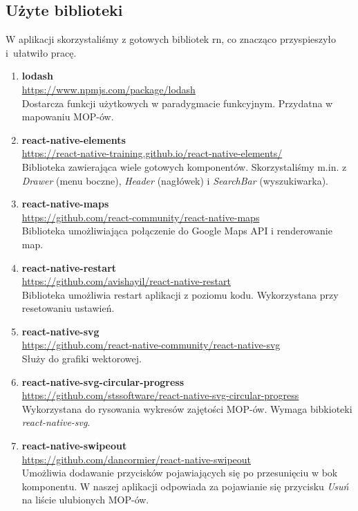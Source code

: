 \subsection{Użyte biblioteki}
W aplikacji skorzystaliśmy z gotowych bibliotek \acrshort{rn}, co znacząco przyspieszyło i~ułatwiło pracę.
\begin{enumerate}
\item \textbf{lodash} \\
\url{https://www.npmjs.com/package/lodash}\\
Dostarcza funkcji użytkowych w paradygmacie funkcyjnym. Przydatna w mapowaniu MOP-ów.

\item \textbf{react-native-elements}\\
\url{https://react-native-training.github.io/react-native-elements/}\\ 
Biblioteka zawierająca wiele gotowych komponentów. Skorzystaliśmy m.in. z \textit{Drawer} (menu boczne), \textit{Header} (nagłówek) i \textit{SearchBar} (wyszukiwarka).

\item \textbf{react-native-maps} \\
\url{https://github.com/react-community/react-native-maps}\\
Biblioteka umożliwiająca połączenie do Google Maps API i renderowanie map.

\item \textbf{react-native-restart} \\
\url{https://github.com/avishayil/react-native-restart}\\
Biblioteka umożliwia restart aplikacji z poziomu kodu. Wykorzystana przy resetowaniu ustawień.

\item \textbf{react-native-svg} \\
\url{https://github.com/react-native-community/react-native-svg}\\
Służy do grafiki wektorowej.

\item \textbf{react-native-svg-circular-progress} \\
\url{https://github.com/stssoftware/react-native-svg-circular-progress}\\
Wykorzystana do rysowania wykresów zajętości MOP-ów. Wymaga bibkioteki \textit{react-native-svg}.

\item \textbf{react-native-swipeout} \\
\url{https://github.com/dancormier/react-native-swipeout}\\
Umożliwia dodawanie przycisków pojawiających się po przesunięciu w bok komponentu. W naszej aplikacji odpowiada za pojawianie się przycisku \textit{Usuń} na liście ulubionych MOP-ów.


\end{enumerate}
